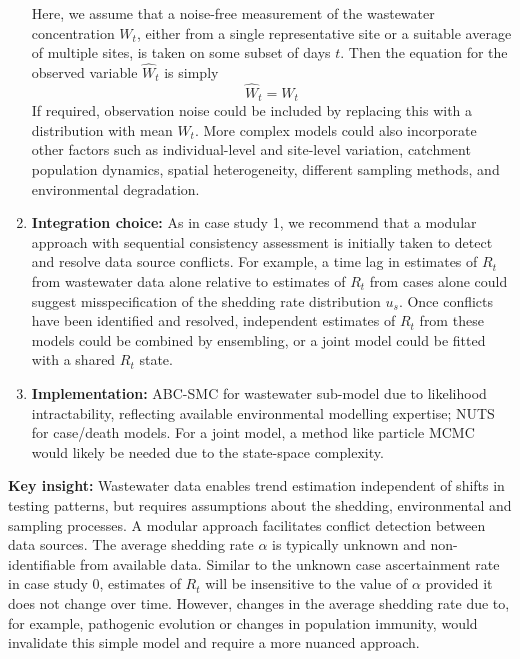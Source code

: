 \documentclass{article}
\begin{document}
\begin{enumerate}
    Here, we assume that a noise-free measurement of the wastewater concentration $W_t$, either from a single representative site or a suitable average of multiple sites, is taken on some subset of days $t$. Then the equation for the observed variable $\hat{W}_t$ is simply
    \begin{equation}
        \hat{W}_t=W_t
    \end{equation}
    If required, observation noise could be included by replacing this with a distribution with mean $W_t$. 
    More complex models could also incorporate other factors such as individual-level and site-level variation, catchment population dynamics, spatial heterogeneity, different sampling methods, and environmental degradation.
    \item \textbf{Integration choice:} As in case study 1, we recommend that a modular approach with sequential consistency assessment is initially taken to detect and resolve data source conflicts. For example, a time lag in estimates of $R_t$ from wastewater data alone relative to estimates of $R_t$ from cases alone could suggest misspecification of the shedding rate distribution $u_s$. Once conflicts have been identified and resolved, independent estimates of $R_t$ from these models could be combined by ensembling, or a joint model could be fitted with a shared $R_t$ state. 
    \item \textbf{Implementation:} ABC-SMC for wastewater sub-model due to likelihood intractability, reflecting available environmental modelling expertise; NUTS for case/death models. For a joint model, a method like particle MCMC would likely be needed due to the state-space complexity.
\end{enumerate}

\textbf{Key insight:} Wastewater data enables trend estimation independent of shifts in testing patterns, but requires assumptions about the shedding, environmental and sampling processes. A modular approach facilitates conflict detection between data sources. The average shedding rate $\alpha$ is typically unknown and non-identifiable from available data. Similar to the unknown case ascertainment rate in case study 0, estimates of $R_t$ will be insensitive to the value of $\alpha$ provided it does not change over time. However, changes in the average shedding rate due to, for example, pathogenic evolution or changes in population immunity, would invalidate this simple model and require a more nuanced approach.  
\end{document}
